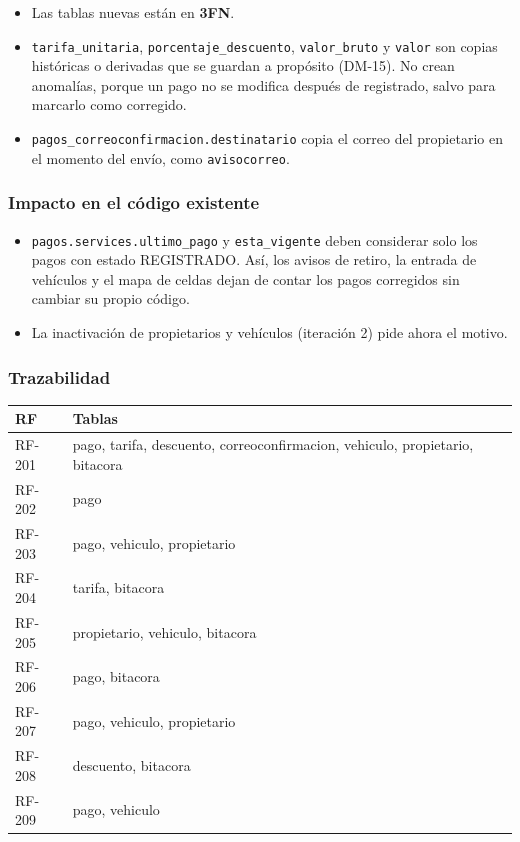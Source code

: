 \begin{itemize}
  \item Las tablas nuevas están en \textbf{3FN}.
  \item \texttt{tarifa\_unitaria}, \texttt{porcentaje\_descuento}, \texttt{valor\_bruto} y \texttt{valor} son copias históricas o derivadas que se guardan a propósito (DM-15). No crean anomalías, porque un pago no se modifica después de registrado, salvo para marcarlo como corregido.
  \item \texttt{pagos\_correoconfirmacion.destinatario} copia el correo del propietario en el momento del envío, como \texttt{avisocorreo}.
\end{itemize}

\subsubsection{Impacto en el código existente}

\begin{itemize}
  \item \texttt{pagos.services.ultimo\_pago} y \texttt{esta\_vigente} deben considerar solo los pagos con estado REGISTRADO. Así, los avisos de retiro, la entrada de vehículos y el mapa de celdas dejan de contar los pagos corregidos sin cambiar su propio código.
  \item La inactivación de propietarios y vehículos (iteración 2) pide ahora el motivo.
\end{itemize}

\subsubsection{Trazabilidad}

\begin{longtable}{>{\raggedright\arraybackslash}p{2.9cm}>{\raggedright\arraybackslash}p{11.5cm}}
\toprule
\textbf{RF} & \textbf{Tablas}\\
\midrule\endhead
RF-201 & pago, tarifa, descuento, correoconfirmacion, vehiculo, propietario, bitacora\\
RF-202 & pago\\
RF-203 & pago, vehiculo, propietario\\
RF-204 & tarifa, bitacora\\
RF-205 & propietario, vehiculo, bitacora\\
RF-206 & pago, bitacora\\
RF-207 & pago, vehiculo, propietario\\
RF-208 & descuento, bitacora\\
RF-209 & pago, vehiculo\\
\bottomrule
\end{longtable}




